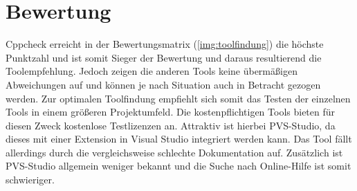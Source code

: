 \section{Bewertung}
\label{sec:bewertung}

Cppcheck erreicht in der Bewertungsmatrix (\ref{img:toolfindung}) die höchste Punktzahl und ist somit Sieger der Bewertung und daraus resultierend die Toolempfehlung. 
Jedoch zeigen die anderen Tools keine übermäßigen Abweichungen auf und können je nach Situation auch in Betracht gezogen werden. \newline
Zur optimalen Toolfindung empfiehlt sich somit das Testen der einzelnen Tools in einem größeren Projektumfeld. Die kostenpflichtigen Tools bieten für diesen Zweck kostenlose 
Testlizenzen an. Attraktiv ist hierbei PVS-Studio, da dieses mit einer Extension in Visual Studio integriert werden kann. Das Tool fällt allerdings durch die vergleichsweise 
schlechte Dokumentation auf. Zusätzlich ist PVS-Studio allgemein weniger bekannt und die Suche nach Online-Hilfe ist somit schwieriger.
